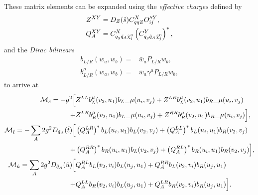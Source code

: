 \documentclass[../main.tex]{subfiles}
\begin{document}
These matrix elements can be expanded using the \textit{effective charges} defined by
\begin{subequations}
  \label{part:eq:eff_charges}
  \begin{align}
    Z^{XY}   & = D_Z(\hat{s}) C_{qqZ}^X O_{ij}^{\prime\prime Y},                                   \\
    Q_A^{XY} & = C_{q_g \tilde{q}_A \nino[i]}^{X} \pclosed{C_{q_g \tilde{q}_A \nino[j]}^{Y}}^\ast,
  \end{align}
\end{subequations}
and the \emph{Dirac bilinears}
\begin{subequations}
  \begin{align}
    b_{L/R}(w_a, w_b) =     & \bar{w}_a P_{L/R} w_b,            \\
    b_{L/R}^\mu(w_a, w_b) = & \bar{w}_a \gamma^\mu P_{L/R} w_b,
  \end{align}
\end{subequations}
to arrive at
\begin{subequations}
  \label{part:eq:MLO}
  \begin{align}
    \nonumber
    \M_{\hat{s}} = -g^2 \Big[                                  &
    Z^{LL} b_L^\mu(v_2, u_1){b_L}\_{\mu}(u_i, v_j) + Z^{LR} b_L^\mu(v_2, u_1){b_R}\_{\mu}(u_i, v_j)                 \\
    +                                                          & Z^{LR} b_{R}^\mu(v_2, u_1){b_L}\_{\mu}(u_i, v_j) +
    Z^{RR} b_R^\mu(v_2, u_1){b_R}\_{\mu}(u_i, v_j) \Big],                                                           \\
    \nonumber
    \M_{\hat{t}} = -\sum_A 2g^2 D_{\tilde{q}_A}(\hat{t}) \Big[ &
    \pclosed{Q_A^{LR}}^\ast b_L(u_i, u_1) b_L(v_2, v_j) +
    \pclosed{Q_A^{LL}}^\ast
    b_L(u_i, u_1) b_R(v_2, v_j)                                                                                     \\
    +                                                          &
    \pclosed{Q_A^{RR}}^\ast b_R(u_i, u_1) b_L(v_2, v_j) +
    \pclosed{Q_A^{RL}}^\ast
    b_R(u_i, u_1) b_R(v_2, v_j) \Big],                                                                              \\
    \nonumber
    \M_{\hat{u}} = \sum_A 2g^2 D_{\tilde{q}_A}(\hat{u}) \Big[  &
    Q_A^{RL} b_L(v_2, v_i) b_L(u_j, u_1) + Q_A^{RR} b_L(v_2, v_i)
    b_R(u_j, u_1)
    \\
    +                                                          &
    Q_A^{LL} b_R(v_2, v_i) b_L(u_j, u_1) + Q_A^{LR} b_R(v_2, v_i)
    b_R(u_j, u_1)
    \Big].
  \end{align}
\end{subequations}
\end{document}
